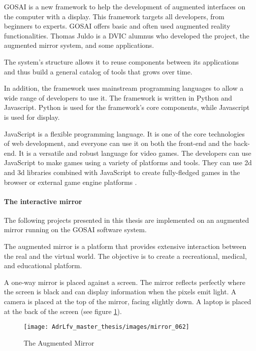 GOSAI is a new framework to help the development of augmented interfaces on the computer with a display. This framework targets all developers, from beginners to experts. GOSAI offers
basic and often used augmented reality functionalities. Thomas Juldo is a DVIC alumnus who developed the project, the augmented mirror system, and some applications. 

The system's structure allows it to reuse components between its applications and thus build a general catalog of tools that grows over time.

In addition, the framework uses mainstream programming languages to allow a wide range of developers to
use it. The framework is written in Python and Javascript.
Python is used for the framework's core components,
while Javascript is used for display.

JavaScript is a flexible programming language. It is one of the core
technologies of web development, and everyone can use it on both the
front-end and the back-end.
It is a versatile and robust language for video games. The developers can use JavaScript to make games using a variety of platforms and tools. They can use 2d and 3d libraries combined with JavaScript to create fully-fledged games in the browser or external game engine platforms \cite{javascriptgaming}.

\paragraph[short]{The interactive mirror}

The following projects presented in this thesis are implemented on an augmented mirror running on the GOSAI software system.

The augmented mirror is a platform that provides extensive interaction between the real and the virtual world. The objective is to create a recreational, medical, and educational platform.

A one-way mirror is placed against a screen. The mirror reflects perfectly where the screen is black and can display information when the pixels emit light. A camera is placed at the top of the mirror, facing slightly down. A laptop is placed at the back of the screen (see figure \ref{fig:mirror_062}).

\begin{figure}[h]
    \centering
    \texttt{[image: AdrLfv\_master\_thesis/images/mirror\_062]}
    \caption{The Augmented Mirror}
    \label{fig:mirror_062}
\end{figure}

